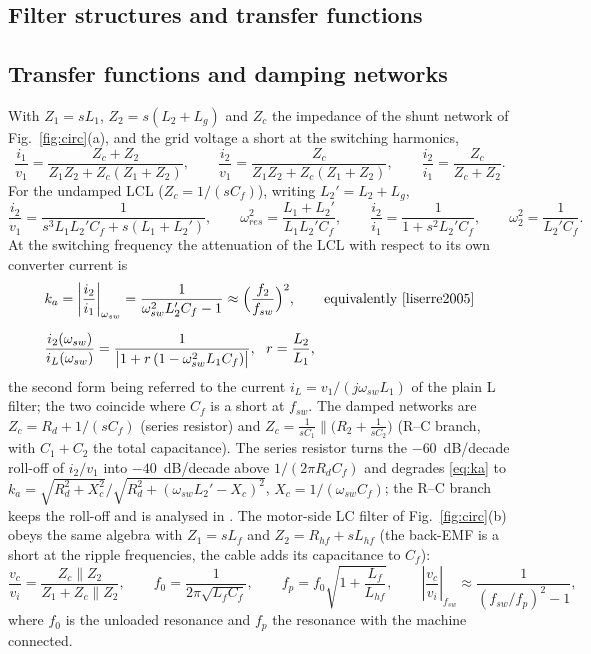 \documentclass[10pt,a4paper]{scrartcl}
\newcommand{\fsw}{f_{sw}}
\newcommand{\wsw}{\omega_{sw}}
\newcommand{\wres}{\omega_{res}}
\newcommand{\Lhf}{L_{hf}}
\newcommand{\Rhf}{R_{hf}}
\newcommand{\Cf}{C_{f}}
\newcommand{\Lf}{L_{f}}
\newcommand{\Lg}{L_{g}}
\begin{document}
\begin{onehalfspace}
\section{Filter structures and transfer functions}
\label{sec:tf}
\subsection{Transfer functions and damping networks}
With $Z_1 = sL_1$, $Z_2 = s(L_2 + \Lg)$ and $Z_c$ the impedance of the shunt network of Fig.~\ref{fig:circ}(a), and the grid voltage a short at the switching harmonics,
\begin{equation}
\frac{i_1}{v_1} = \frac{Z_c + Z_2}{Z_1 Z_2 + Z_c (Z_1 + Z_2)},\qquad
\frac{i_2}{v_1} = \frac{Z_c}{Z_1 Z_2 + Z_c (Z_1 + Z_2)},\qquad
\frac{i_2}{i_1} = \frac{Z_c}{Z_c + Z_2}.
\label{eq:tf}
\end{equation}
For the undamped LCL ($Z_c = 1/(s\Cf)$), writing $L_2' = L_2 + \Lg$,
\begin{equation}
\frac{i_2}{v_1} = \frac{1}{s^3 L_1 L_2' \Cf + s(L_1 + L_2')},\qquad
\wres^2 = \frac{L_1 + L_2'}{L_1 L_2' \Cf},\qquad
\frac{i_2}{i_1} = \frac{1}{1 + s^2 L_2' \Cf},\qquad
\omega_2^2 = \frac{1}{L_2'\Cf}.
\label{eq:lcl}
\end{equation}
At the switching frequency the attenuation of the LCL with respect to its own converter current is
\begin{equation}
	\begin{aligned}
		&k_a = \left|\frac{i_2}{i_1}\right|_{\wsw} = \frac{1}{\wsw^2 L_2' \Cf - 1} \approx \Big(\frac{f_2}{\fsw}\Big)^2,
		\qquad\text{equivalently \cite{liserre2005}}\\[6pt]
		&\frac{i_2(\wsw)}{i_{L}(\wsw)} = \frac{1}{\big|1 + r\,(1 - \wsw^2 L_1 \Cf)\big|},\ \ r = \frac{L_2}{L_1},
	\end{aligned}
\label{eq:ka}
\end{equation}
the second form being referred to the current $i_L = v_1/(j\wsw L_1)$ of the plain L filter; the two coincide where $\Cf$ is a short at $\fsw$. The damped networks are $Z_c = R_d + 1/(s\Cf)$ (series resistor) and $Z_c = \frac{1}{s C_1} \parallel \big(R_2 + \frac{1}{s C_2}\big)$ (R--C branch, with $C_1 + C_2$ the total capacitance). The series resistor turns the $-60$~dB/decade roll-off of $i_2/v_1$ into $-40$~dB/decade above $1/(2\pi R_d \Cf)$ and degrades \eqref{eq:ka} to $k_a = \sqrt{R_d^2 + X_c^2}/\sqrt{R_d^2 + (\wsw L_2' - X_c)^2}$, $X_c = 1/(\wsw\Cf)$; the R--C branch keeps the roll-off and is analysed in \cite{bagnara2026,erickson1999,erickson2020,middlebrook1976}. The motor-side LC filter of Fig.~\ref{fig:circ}(b) obeys the same algebra with $Z_1 = s\Lf$ and $Z_2 = \Rhf + s\Lhf$ (the back-EMF is a short at the ripple frequencies, the cable adds its capacitance to $\Cf$):
\begin{equation}
\frac{v_c}{v_i} = \frac{Z_c \parallel Z_2}{Z_1 + Z_c \parallel Z_2},\qquad
f_0 = \frac{1}{2\pi\sqrt{\Lf\Cf}},\qquad
f_p = f_0\sqrt{1 + \frac{\Lf}{\Lhf}},\qquad
\left|\frac{v_c}{v_i}\right|_{\fsw} \approx \frac{1}{(\fsw/f_p)^2 - 1},
\label{eq:lc}
\end{equation}
where $f_0$ is the unloaded resonance and $f_p$ the resonance with the machine connected.


\end{onehalfspace}
\end{document}
